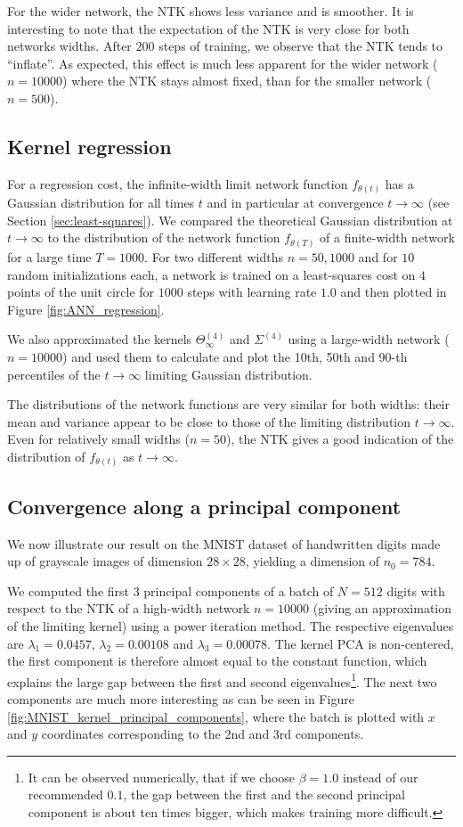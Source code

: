 For the wider network, the NTK shows less variance and is smoother. It is interesting to note that the expectation of the NTK is very close for both networks widths. After $200$ steps of training, we observe that the NTK tends to ``inflate''. As expected, this effect is much less apparent for the wider network ($n=10000$) where the NTK stays almost fixed, than for the smaller network ($n=500$).

\subsection{Kernel regression} For a regression cost, the infinite-width limit network function $f_{\theta(t)}$ has a Gaussian distribution for all times $t$ and in particular at convergence $t\to \infty $ (see Section \ref{sec:least-squares}). We compared the theoretical Gaussian distribution at $t\to\infty$ to the distribution of the network function $f_{\theta(T)}$ of a finite-width network for a large time $T=1000$. For two different widths $n=50, 1000$ and for $10$ random initializations each, a network is trained on a least-squares cost on $4$ points of the unit circle for $1000$ steps with learning rate $1.0$ and then plotted in Figure \ref{fig:ANN_regression}.

We also approximated the kernels $\Theta_\infty^{(4)}$ and $\Sigma^{(4)}$ using a large-width network ($n=10000$) and used them to calculate and plot the 10th, 50th and 90-th percentiles of the $t\to \infty$ limiting Gaussian distribution.

The distributions of the network functions are very similar for both widths: their mean and variance appear to be close to those of the limiting distribution $t \to \infty$. Even for relatively small widths ($n=50$), the NTK gives a good indication of the distribution of $f_{\theta(t)}$ as $t\to\infty$.

\subsection{Convergence along a principal component} We now illustrate our result on the MNIST dataset of handwritten digits made up of grayscale images of dimension $28 \times 28$, yielding a dimension of $n_0 = 784$.

We computed the first 3 principal components of a batch of $N=512$ digits with respect to the NTK of a high-width network $n=10000$ (giving an approximation of the limiting kernel) using a power iteration method. The respective eigenvalues are $\lambda_1=0.0457$, $\lambda_2=0.00108$ and $\lambda_3=0.00078$. The kernel PCA is non-centered, the first component is therefore almost equal to the constant function, which explains the large gap between the first and second eigenvalues\footnote{It can be observed numerically, that if we choose $\beta=1.0$ instead of our recommended $0.1$, the gap between the first and the second principal component is about ten times bigger, which makes training more difficult.}. The next two components are much more interesting as can be seen in Figure \ref{fig:MNIST_kernel_principal_components}, where the batch is plotted with $x$ and $y$ coordinates corresponding to the 2nd and 3rd components.

